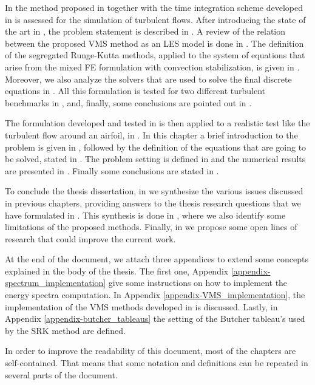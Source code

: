 In  the method proposed in  together with the time integration scheme developed in  is assessed for the simulation of turbulent flows. After introducing the state of the art in , the problem statement is described in . A review of the relation between the proposed VMS method as an LES model is done in . The definition of the segregated Runge-Kutta methods, applied to the system of equations that arise from the mixed FE formulation with convection stabilization, is given in . Moreover, we also analyze the solvers that are used to solve the final discrete equations in . All this formulation is tested for two different turbulent benchmarks in , and, finally, some conclusions are pointed out in .

The formulation developed and tested in  is then applied to a realistic test like the turbulent flow around an airfoil, in . In this chapter a brief introduction to the problem is given in , followed by the definition of the equations that are going to be solved, stated in . The problem setting is defined in  and the numerical results are presented in . Finally some conclusions are stated in .

To conclude the thesis dissertation, in  we synthesize the various issues discussed in previous chapters, providing answers to the thesis research questions that we have formulated in . This synthesis is done in , where we also identify some limitations of the proposed methods. Finally, in  we propose some open lines of research that could improve the current work.

At the end of the document, we attach three appendices to extend some concepts explained in the body of the thesis. The first one, Appendix \ref{appendix-spectrum_implementation} give some instructions on how to implement the energy spectra computation. In Appendix \ref{appendix-VMS_implementation}, the implementation of the VMS methods developed in  is discussed. Lastly, in Appendix \ref{appendix-butcher_tableaus} the setting of the Butcher tableau's used by the SRK method are defined.

In order to improve the readability of this document, most of the chapters are self-contained. That means that some notation and definitions can be repeated in several parts of the document.

